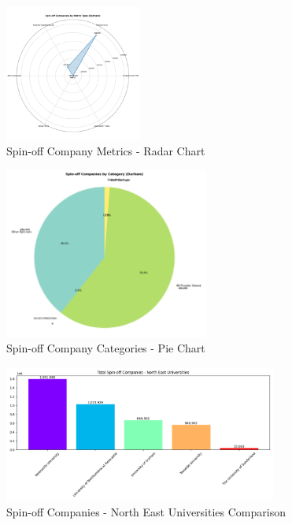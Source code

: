 \documentclass[journal,onecolumn, 10pt,draftclsnofoot]{IEEEtran}
\begin{document}
\begin{figure}[h]
\centering
\includegraphics[width=0.4\textwidth]{Fig/figure27.spin_metric_type.png}
\caption{Spin-off Company Metrics - Radar Chart}
\label{fig:spin-metric-type}
\end{figure}
\hfill
\begin{figure}[h]
\centering
\includegraphics[width=0.6\textwidth]{Fig/figure28.spin_category.png}
\caption{Spin-off Company Categories - Pie Chart}
\label{fig:spin-category}
\end{figure}

\begin{figure}[h]
\centering
\includegraphics[width=0.8\textwidth]{Fig/figure29.spin_ne_comparison.png}
\caption{Spin-off Companies - North East Universities Comparison}
\label{fig:spin-ne-comparison}
\end{figure}
\end{document}
